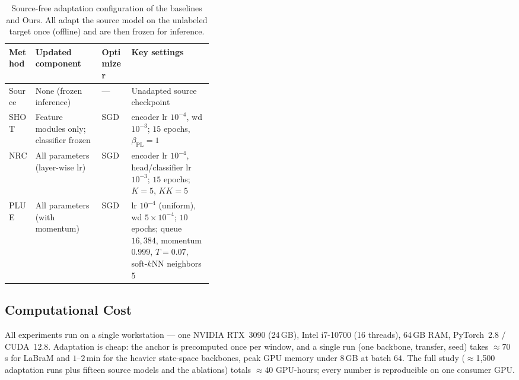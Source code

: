 \documentclass[letterpaper]{article} %
\begin{document}
\begin{table}[t]\centering\small
\caption{Source-free adaptation configuration of the baselines and Ours. All adapt the source
model on the unlabeled target once (offline) and are then frozen for inference.}
\label{tab:tta_config}
\begin{tabular}{lllp{0.40\linewidth}}
\toprule
\textbf{Method} & \textbf{Updated component} & \textbf{Optimizer} & \textbf{Key settings} \\
\midrule
Source & None (frozen inference) & --- & Unadapted source checkpoint \\
SHOT & Feature modules only; classifier frozen & SGD & encoder lr $10^{-4}$, wd $10^{-3}$; $15$ epochs, $\beta_{\mathrm{PL}}=1$ \\NRC & All parameters (layer-wise lr) & SGD & encoder lr $10^{-4}$, head/classifier lr $10^{-3}$; $15$ epochs; $K{=}5$, $KK{=}5$ \\
PLUE & All parameters (with momentum) & SGD & lr $10^{-4}$ (uniform), wd $5{\times}10^{-4}$; $10$ epochs; queue $16{,}384$, momentum $0.999$, $T{=}0.07$, soft-$k$NN neighbors $5$ \\
\bottomrule
\end{tabular}
\end{table}


\subsection{Computational Cost}
All experiments run on a single workstation --- one NVIDIA RTX~3090 (24\,GB), Intel i7-10700 (16 threads), 64\,GB RAM, PyTorch~2.8 / CUDA~12.8. Adaptation is cheap: the anchor is precomputed once per window, and a single run (one backbone, transfer, seed) takes $\approx$70\,s for LaBraM and $1$--$2$\,min for the heavier state-space backbones, peak GPU memory under $8$\,GB at batch $64$. The full study ($\approx$1{,}500 adaptation runs plus fifteen source models and the ablations) totals $\approx$40 GPU-hours; every number is reproducible on one consumer GPU.

\end{document}
